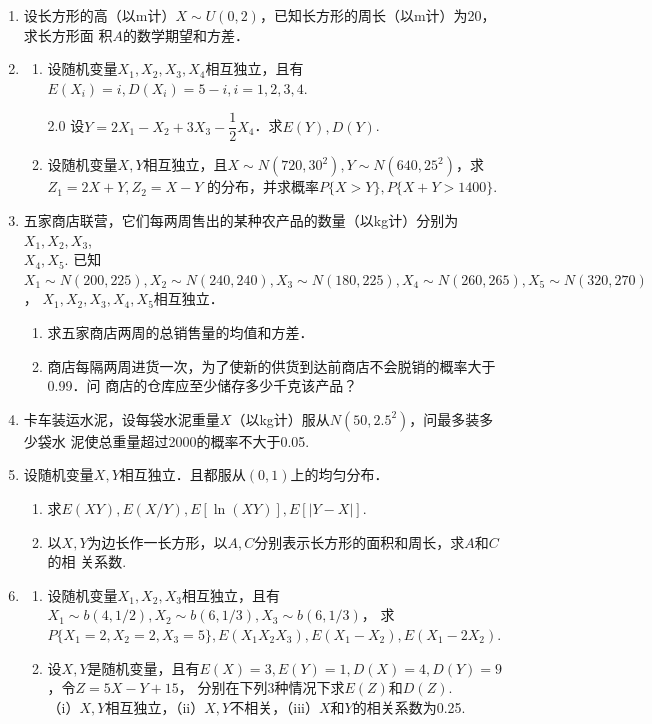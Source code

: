 \begin{enumerate}
    \item 设长方形的高（以m计）$X\sim U(0,2)$，已知长方形的周长（以m计）为20，求长方形面
    积$A$的数学期望和方差．


    \item \begin{enumerate}
        \item 设随机变量$X_1,X_2,X_3,X_4$相互独立，且有$E(X_i)=i,D(X_i)=5-i,i=1,2,3,4$.
        \vspace{-0.2cm}
        \begin{spacing}{2.0}
        设$Y=2X_1-X_2+3X_3-\dfrac{1}{2}X_4$．求$E(Y),D(Y)$.
        \end{spacing}
        \vspace{-0.2cm}
    \item 设随机变量$X,Y$相互独立，且$X\sim N(720,30^2),Y\sim N(640,25^2)$，求$Z_1=2X+Y,Z_2=X-Y$
    的分布，并求概率$P\{X>Y\},P\{X+Y>1400\}$.
    \end{enumerate}



    \item 五家商店联营，它们每两周售出的某种农产品的数量（以kg计）分别为$X_1,X_2,X_3$, \\ $X_4,X_5$.
    已知$X_1\sim N(200,225),X_2\sim N(240,240),X_3\sim N(180,225),X_4\sim N(260,265),X_5\sim N(320,270)$，
    $X_1,X_2,X_3,X_4,X_5$相互独立．
    \begin{enumerate}
        \item 求五家商店两周的总销售量的均值和方差．
        \item 商店每隔两周进货一次，为了使新的供货到达前商店不会脱销的概率大于0.99．问
        商店的仓库应至少储存多少千克该产品？
    \end{enumerate}



    \item 卡车装运水泥，设每袋水泥重量$X$（以kg计）服从$N(50,2.5^2)$，问最多装多少袋水
    泥使总重量超过2000的概率不大于0.05.


    \item 设随机变量$X,Y$相互独立．且都服从$(0,1)$上的均匀分布．
    \begin{enumerate}
        \item 求$E(XY),E(X/Y),E[\ln (XY)],E[|Y-X|]$.
        \item 以$X,Y$为边长作一长方形，以$A,C$分别表示长方形的面积和周长，求$A$和$C$的相
        关系数.
    \end{enumerate}


    \item \begin{enumerate}
        \item 设随机变量$X_1,X_2,X_3$相互独立，且有$X_1\sim b(4,1/2),X_2\sim b(6,1/3),X_3\sim b(6,1/3)$，
        求$P\{X_1=2,X_2=2,X_3=5\},E(X_1X_2X_3),E(X_1-X_2),E(X_1-2X_2)$.
        \item 设$X,Y$是随机变量，且有$E(X)=3,E(Y)=1,D(X)=4,D(Y)=9$，令$Z=5X-Y+15$，
        分别在下列3种情况下求$E(Z)$和$D(Z)$.\\
        （i）$X,Y$相互独立，（ii）$X,Y$不相关，（iii）$X$和$Y$的相关系数为0.25.
    \end{enumerate}



\end{enumerate}
